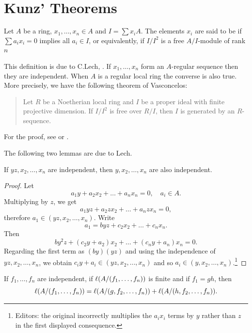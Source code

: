\documentclass[../main]{subfiles}
\begin{document}
\section{Kunz' Theorems}\label{sec:42}

\newparagraph Let $A$ be a ring, $x_1, \ldots, x_n \in A$ and $I=\sum x_i A$. The elements $x_i$ are said to be  if $\sum a_i x_i=0$ implies all $a_i \in I$, or equivalently, if $I / I^2$ is a free $A/I$-module of rank $n$

This definition is due to C.Lech, \cite{lech1964inequalities}. If $x_1, \ldots, x_n$ form an $A$-regular sequence then they are independent. When $A$ is a regular local ring the converse is also true. More precisely, we have the following theorem of Vasconcelos:
\begin{quote}
    Let $R$ be a Noetherian local ring and $I$ be a proper ideal with finite projective dimension. If $I/I^2$ is free over $R / I$, then $I$ is generated by an $R$-sequence.
\end{quote}
For the proof, see \cite{vasconcelos1967ideal} or \cite[Th. 199]{kaplansky1970commutative}.

The following two lemmas are due to Lech.

\begin{lemma}\label{lem:42.01}
If $y z, x_2, \ldots, x_n$ are independent, then $y, x_2, \ldots, x_n$ are also independent.
\end{lemma}

\begin{proof}
Let \[a_1 y+a_2 x_2+\ldots+a_n x_n=0, \quad a_i \in A.\] Multiplying by $z$, we get \[a_1 y z+a_2 z x_2+\ldots+a_n z x_n=0,\] therefore $a_1 \in(y z, x_2, \ldots, x_n)$. Write \[a_1=b y z+c_2 x_2+\ldots+c_n x_n.\] Then \[b y^2 z+(c_2 y+a_2) x_2+\ldots+(c_n y+a_n) x_n=0.\] Regarding the first term as $(by)(yz)$ and using the independence of $yz,x_2,\ldots,x_n$, we obtain $c_i y+a_i \in(y z, x_2, \ldots, x_n)$ and so $a_i \in(y, x_2, \ldots, x_n)$.\footnote{Editors: the original incorrectly multiplies the $a_i x_i$ terms by $y$ rather than $z$ in the first displayed consequence.}
\end{proof} 

\begin{lemma}\label{lem:42.02}
If $f_1, \ldots, f_n$ are independent, if $\ell(A /(f_1, \dots, f_n))$ is finite and if $f_1=gh$, then \[\ell(A /(f_1, \dots, f_n))=\ell(A/(g, f_2, \dots, f_n))+\ell(A /(h, f_2, \dots, f_n)).\]
\end{lemma}
\end{document}
